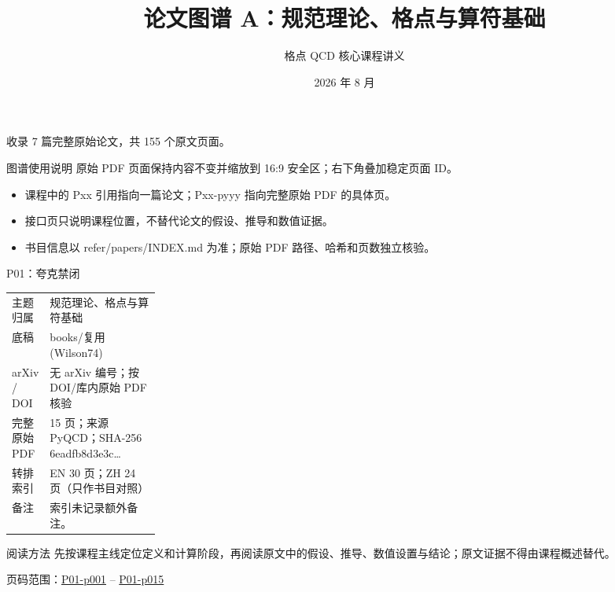 \documentclass[aspectratio=169,10pt]{ctexbeamer}
\title{论文图谱 A：规范理论、格点与算符基础}
\author{格点 QCD 核心课程讲义}
\date{2026 年 8 月}
\begin{document}
\begin{frame}[plain]\titlepage
\vfill\centering 收录 7 篇完整原始论文，共 155 个原文页面。
\end{frame}
\begin{frame}[t]{图谱使用说明}
\small 原始 PDF 页面保持内容不变并缩放到 16:9 安全区；右下角叠加稳定页面 ID。
\begin{itemize}
\item 课程中的 Pxx 引用指向一篇论文；Pxx-pyyy 指向完整原始 PDF 的具体页。
\item 接口页只说明课程位置，不替代论文的假设、推导和数值证据。
\item 书目信息以 refer/papers/INDEX.md 为准；原始 PDF 路径、哈希和页数独立核验。
\end{itemize}\end{frame}
\begin{frame}[t]{P01：夸克禁闭}
\small\begin{tabularx}{\linewidth}{p{0.22\linewidth}Y}
\toprule 主题归属 & 规范理论、格点与算符基础\\
底稿 & books/\allowbreak{}复用(Wilson74)\\
arXiv / DOI & 无 arXiv 编号；按 DOI/\allowbreak{}库内原始 PDF 核验\\
完整原始 PDF & 15 页；来源 PyQCD；SHA-256 6eadfb8d3e3c\ldots\\
转排索引 & EN 30 页；ZH 24 页（只作书目对照）\\
备注 & 索引未记录额外备注。\\
\bottomrule\end{tabularx}\vspace{0.25cm}
\begin{block}{阅读方法}
先按课程主线定位定义和计算阶段，再阅读原文中的假设、推导、数值设置与结论；原文证据不得由课程概述替代。
\end{block}
\vfill 页码范围：\hyperlink{P01-p001}{P01-p001} -- \hyperlink{P01-p015}{P01-p015}
\end{frame}
\end{document}
